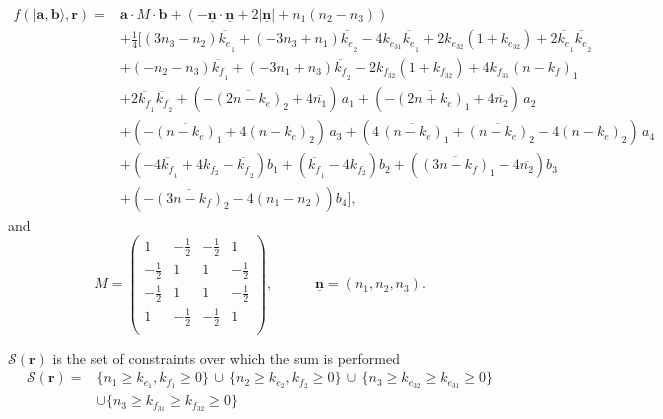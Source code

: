 \documentclass[12pt,oneside,reqno]{amsart}
\numberwithin{teorema}{section}
\numberwithin{definicion}{section}
\numberwithin{lema}{section}
\numberwithin{conjetura}{section}
\numberwithin{proposicion}{section}
\def\okef{\overline{k_e}_{{}_1}}
\def\okes{\overline{k_e}_{{}_2}}
\def\okff{\overline{k_f}_{{}_1}}
\def\okfs{\overline{k_f}_{{}_2}}
\def\kfs{k_{f_2}}
\def\ketf{k_{e_{31}}}
\def\kets{k_{e_{32}}}
\def\kftf{k_{f_{31}}}
\def\kfts{k_{f_{32}}}
\def\onf{\overline{n_1}}
\def\ons{\overline{n_2}}
\begin{document}
\begin{align*}
    f\left(|\textbf{a},\textbf{b}\rangle,\textbf{r}\right) = &\textbf{a}\cdot M\cdot \textbf{b} + (-\underline{\textbf{n}}\cdot \underline{\textbf{n}}+2|\underline{\textbf{n}}|+n_1(n_2-n_3)) \\
    &+ \frac{1}{4}\Bigg[(3n_3-n_2)\okef + (-3n_3+n_1)\okes - 4\ketf \okef + 2\kets(1+\kets)+2\okef\okes \\
    &+ (-n_2-n_3)\okff + (-3n_1+n_3)\okfs - 2\kfts(1+\kfts)+4\kftf(n-k_f)_{1}\\
    &+2\okff\okfs +(-\overline{(2n-k_e)}_{2}+4\onf)\,a_1 +(-\overline{(2n+k_e)}_{1}+4\ons)\,a_2\\
    &+(-\overline{(n-k_e)}_{1} +4(n-k_e)_2)\,a_3 +(4\,\overline{(n-k_e)}_{1}+\overline{(n-k_e)}_{2}-4(n-k_e)_2)\,a_4 \\
    &+ (-4\okff +4 \kfs -\okfs) b_1 +(\okff -4\kfs)b_2+(\overline{(3n-k_f)}_{1}-4\ons)b_3\\
    &+(-\overline{(3n-k_f)}_{2}-4(n_1-n_2))b_4\Bigg],
\end{align*}
and
\begin{equation*}
    M = \begin{pmatrix}
        1 & -\frac12 & -\frac12 & 1 \\
        -\frac12 & 1 & 1 & -\frac12 \\
        -\frac12 & 1 & 1 & -\frac12 \\
        1 & -\frac12 & -\frac12 & 1 \\
    \end{pmatrix}
    , \hspace{3em} \underline{\textbf{n}} = (n_1,n_2,n_3).
\end{equation*}



$\mathcal{S}(\textbf{r})$ is the set of constraints over which the sum is performed
\begin{equation}\label{eq:Sr}
\begin{split}
        \mathcal{S}(\textbf{r}) = &\{n_1\geq k_{e_1},k_{f_1}\geq 0\}\,\cup\,\{n_2\geq k_{e_2},k_{f_2}\geq0\}\,\cup\,\{n_3\geq k_{e_{32}}\geq k_{e_{31}}\geq 0\} \\ &\cup\{n_3\geq k_{f_{31}}\geq k_{f_{32}}\geq 0\}
    \end{split}
\end{equation}
\end{document}
